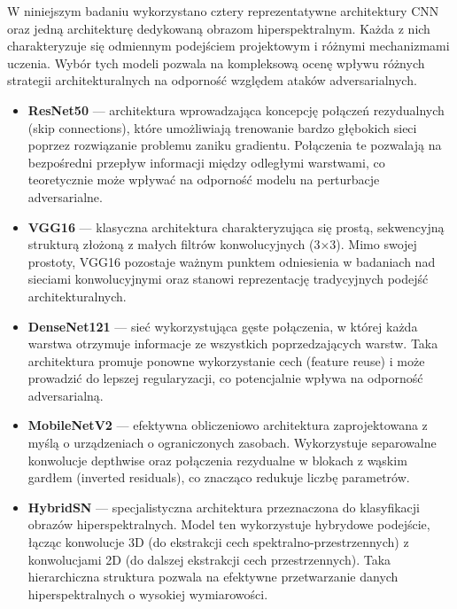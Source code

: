 \documentclass[12pt]{article}
\begin{document}
W niniejszym badaniu wykorzystano cztery reprezentatywne architektury CNN oraz jedną architekturę dedykowaną obrazom hiperspektralnym. Każda z nich charakteryzuje się odmiennym podejściem projektowym i różnymi mechanizmami uczenia. Wybór tych modeli pozwala na kompleksową ocenę wpływu różnych strategii architekturalnych na odporność względem ataków adversarialnych.

\begin{itemize}
    \item \textbf{ResNet50} \supercite{he2016deep} --- architektura wprowadzająca koncepcję połączeń rezydualnych (skip connections), które umożliwiają trenowanie bardzo głębokich sieci poprzez rozwiązanie problemu zaniku gradientu. Połączenia te pozwalają na bezpośredni przepływ informacji między odległymi warstwami, co teoretycznie może wpływać na odporność modelu na perturbacje adversarialne.
    \item \textbf{VGG16} \supercite{simonyan2014very} --- klasyczna architektura charakteryzująca się prostą, sekwencyjną strukturą złożoną z małych filtrów konwolucyjnych (3×3). Mimo swojej prostoty, VGG16 pozostaje ważnym punktem odniesienia w badaniach nad sieciami konwolucyjnymi oraz stanowi reprezentację tradycyjnych podejść architekturalnych.
    \item \textbf{DenseNet121} \supercite{huang2017densely} --- sieć wykorzystująca gęste połączenia, w której każda warstwa otrzymuje informacje ze wszystkich poprzedzających warstw. Taka architektura promuje ponowne wykorzystanie cech (feature reuse) i może prowadzić do lepszej regularyzacji, co potencjalnie wpływa na odporność adversarialną.
    \item \textbf{MobileNetV2} \supercite{sandler2018mobilenetv2} --- efektywna obliczeniowo architektura zaprojektowana z myślą o urządzeniach o ograniczonych zasobach. Wykorzystuje separowalne konwolucje depthwise oraz połączenia rezydualne w blokach z wąskim gardłem (inverted residuals), co znacząco redukuje liczbę parametrów.    
    \item \textbf{HybridSN} \supercite{roy2019hybridsn} --- specjalistyczna architektura przeznaczona do klasyfikacji obrazów hiperspektralnych. Model ten wykorzystuje hybrydowe podejście, łącząc konwolucje 3D (do ekstrakcji cech spektralno-przestrzennych) z konwolucjami 2D (do dalszej ekstrakcji cech przestrzennych). Taka hierarchiczna struktura pozwala na efektywne przetwarzanie danych hiperspektralnych o wysokiej wymiarowości.
\end{itemize}
\end{document}
